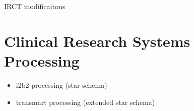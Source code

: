 


IRCT modificaitons

\section{Clinical Research Systems Processing}

\begin{itemize}
    \item i2b2 processing (star schema)
    \item transmart processing (extended star schema)
\end{itemize}

